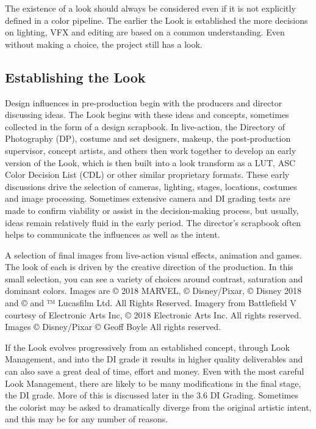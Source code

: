 The existence of a look should always be considered even if it is not explicitly defined in a color pipeline. The earlier the Look is established the more decisions on lighting, VFX and editing are based on a common understanding. Even without making a choice, the project still has a look. 

\subsection{Establishing the Look}

Design influences in pre-production begin with the producers and director discussing ideas. The Look begins with these ideas and concepts, sometimes collected in the form of a design scrapbook. In live-action, the Directory of Photography (DP), costume and set designers, makeup, the post-production supervisor, concept artists, and others then work together to develop an early version of the Look, which is then built into a look transform as a LUT, ASC Color Decision List (CDL) or other similar proprietary formats. These early discussions drive the selection of cameras, lighting, stages, locations, costumes and image processing. Sometimes extensive camera and DI grading tests are made to confirm viability or assist in the decision-making process, but usually, ideas remain relatively fluid in the early period. The director's scrapbook often helps to communicate the influences as well as the intent.








A selection of final images from live-action visual effects, animation and games. The look of each is driven by the creative direction of the production. In this small selection, you can see a variety of choices around contrast, saturation and dominant colors.
Images are © 2018 MARVEL, © Disney/Pixar,  © Disney 2018 and © and ™ Lucasfilm Ltd. All Rights Reserved. Imagery from Battlefield V courtesy of Electronic Arts Inc, © 2018 Electronic Arts Inc. All rights reserved. Images © Disney/Pixar © Geoff Boyle All rights reserved.

If the Look evolves progressively from an established concept, through Look Management, and into the DI grade it results in higher quality deliverables and can also save a great deal of time, effort and money. Even with the most careful Look Management, there are likely to be many modifications in the final stage, the DI grade. More of this is discussed later in the 3.6 DI Grading. Sometimes the colorist may be asked to dramatically diverge from the original artistic intent, and this may be for any number of reasons. 





